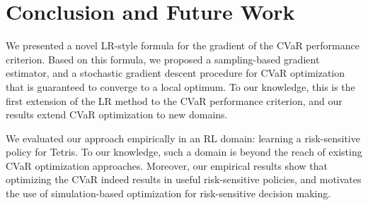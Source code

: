 \documentclass[letterpaper]{article}
\newcommand{\citealt}[1]{\citeauthor{{#1}}, \citeyear{{#1}}}
\newcommand{\citet}[1]{\citeauthor{{#1}} (\citeyear{{#1}})}
\begin{document}
\section{Conclusion and Future Work}
We presented a novel LR-style formula for the gradient of the CVaR performance criterion. Based on this formula, we proposed a sampling-based gradient estimator, and a stochastic gradient descent procedure for CVaR optimization that is guaranteed to converge to a local optimum. To our knowledge, this is the first extension of the LR method to the CVaR performance criterion, and our results extend CVaR optimization to new domains.

We evaluated our approach empirically in an RL domain: learning a risk-sensitive policy for Tetris. To our knowledge, such a domain is beyond the reach of existing CVaR optimization approaches. Moreover, our empirical results show that optimizing the CVaR indeed results in useful risk-sensitive policies, and motivates the use of simulation-based optimization for risk-sensitive decision making.


\end{document}

